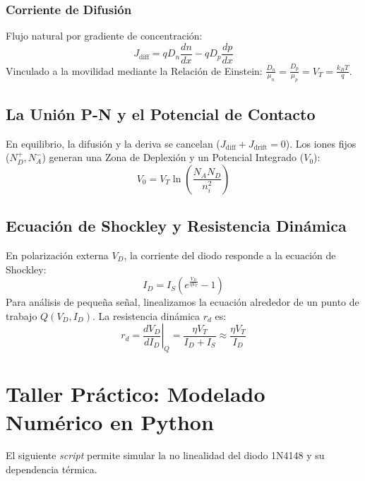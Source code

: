 \documentclass[11pt, a4paper]{article}
\begin{document}
\subsubsection{Corriente de Difusión}
Flujo natural por gradiente de concentración:
\begin{equation}
    J_{\text{diff}} = q D_n \frac{dn}{dx} - q D_p \frac{dp}{dx}
\end{equation}
Vinculado a la movilidad mediante la Relación de Einstein: $\frac{D_n}{\mu_n} = \frac{D_p}{\mu_p} = V_T = \frac{k_B T}{q}$.

\subsection{La Unión P-N y el Potencial de Contacto}
En equilibrio, la difusión y la deriva se cancelan ($J_{\text{diff}} + J_{\text{drift}} = 0$). Los iones fijos ($N_D^+, N_A^-$) generan una Zona de Deplexión y un Potencial Integrado ($V_0$):
\begin{equation}
    V_0 = V_T \ln \left( \frac{N_A N_D}{n_i^2} \right)
\end{equation}

\subsection{Ecuación de Shockley y Resistencia Dinámica}
En polarización externa $V_D$, la corriente del diodo responde a la ecuación de Shockley:
\begin{equation}
    I_D = I_S \left( e^{\frac{V_D}{\eta V_T}} - 1 \right)
\end{equation}
Para análisis de pequeña señal, linealizamos la ecuación alrededor de un punto de trabajo $Q(V_D, I_D)$. La resistencia dinámica $r_d$ es:
\begin{equation}
    r_d = \left. \frac{d V_D}{d I_D} \right\vert_{Q} = \frac{\eta V_T}{I_D + I_S} \approx \frac{\eta V_T}{I_D}
\end{equation}

\newpage
\section{Taller Práctico: Modelado Numérico en Python}
El siguiente \textit{script} permite simular la no linealidad del diodo 1N4148 y su dependencia térmica.
\end{document}
